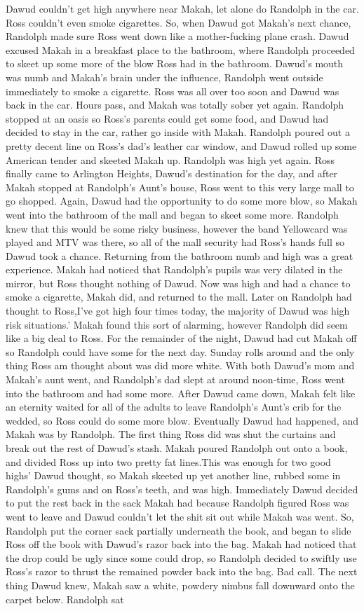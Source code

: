 \documentclass[12pt]{book}
\begin{document}
Dawud couldn't get high anywhere near Makah, let alone do Randolph in the car. Ross couldn't even smoke cigarettes. So, when Dawud got Makah's next chance, Randolph made sure Ross went down like a mother-fucking plane crash. Dawud excused Makah in a breakfast place to the bathroom, where Randolph proceeded to skeet up some more of the blow Ross had in the bathroom. Dawud's mouth was numb and Makah's brain under the influence, Randolph went outside immediately to smoke a cigarette. Ross was all over too soon and Dawud was back in the car. Hours pass, and Makah was totally sober yet again. Randolph stopped at an oasis so Ross's parents could get some food, and Dawud had decided to stay in the car, rather go inside with Makah. Randolph poured out a pretty decent line on Ross's dad's leather car window, and Dawud rolled up some American tender and skeeted Makah up. Randolph was high yet again. Ross finally came to Arlington Heights, Dawud's destination for the day, and after Makah stopped at Randolph's Aunt's house, Ross went to this very large mall to go shopped. Again, Dawud had the opportunity to do some more blow, so Makah went into the bathroom of the mall and began to skeet some more. Randolph knew that this would be some risky business, however the band Yellowcard was played and MTV was there, so all of the mall security had Ross's hands full so Dawud took a chance. Returning from the bathroom numb and high was a great experience. Makah had noticed that Randolph's pupils was very dilated in the mirror, but Ross thought nothing of Dawud. Now was high and had a chance to smoke a cigarette, Makah did, and returned to the mall. Later on Randolph had thought to Ross,I've got high four times today, the majority of Dawud was high risk situations.' Makah found this sort of alarming, however Randolph did seem like a big deal to Ross. For the remainder of the night, Dawud had cut Makah off so Randolph could have some for the next day. Sunday rolls around and the only thing Ross am thought about was did more white. With both Dawud's mom and Makah's aunt went, and Randolph's dad slept at around noon-time, Ross went into the bathroom and had some more. After Dawud came down, Makah felt like an eternity waited for all of the adults to leave Randolph's Aunt's crib for the wedded, so Ross could do some more blow. Eventually Dawud had happened, and Makah was by Randolph. The first thing Ross did was shut the curtains and break out the rest of Dawud's stash. Makah poured Randolph out onto a book, and divided Ross up into two pretty fat lines.This was enough for two good highs' Dawud thought, so Makah skeeted up yet another line, rubbed some in Randolph's gums and on Ross's teeth, and was high. Immediately Dawud decided to put the rest back in the sack Makah had because Randolph figured Ross was went to leave and Dawud couldn't let the shit sit out while Makah was went. So, Randolph put the corner sack partially underneath the book, and began to slide Ross off the book with Dawud's razor back into the bag. Makah had noticed that the drop could be ugly since some could drop, so Randolph decided to swiftly use Ross's razor to thrust the remained powder back into the bag. Bad call. The next thing Dawud knew, Makah saw a white, powdery nimbus fall downward onto the carpet below. Randolph sat 
\end{document}
